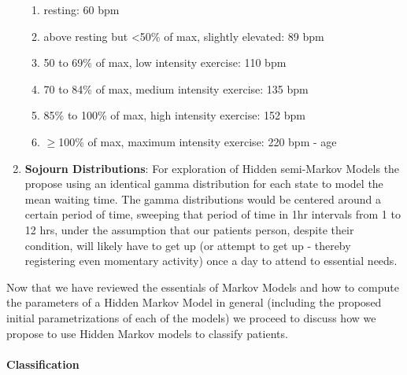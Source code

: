 \documentclass[]{article}
\begin{document}
\begin{enumerate}
	\begin{enumerate}
		\item resting: 60 bpm
		\item above resting but \textless50\% of max, slightly elevated: 89 bpm
		\item 50 to 69\% of max, low intensity exercise: 110 bpm
		\item 70 to 84\% of max, medium intensity exercise: 135 bpm
		\item 85\% to 100\% of max, high intensity exercise: 152 bpm
		\item $\geq$100\% of max, maximum intensity exercise: 220 bpm - age
	\end{enumerate}
	\item \textbf{Sojourn Distributions}: For exploration of Hidden semi-Markov Models the propose using an identical gamma distribution for each state to model the mean waiting time. The gamma distributions would be centered around a certain period of time, sweeping that period of time in 1hr intervals from 1 to 12 hrs, under the assumption that our patients person, despite their condition, will likely have to get up (or attempt to get up - thereby registering even momentary activity) once a day to attend to essential needs.
\end{enumerate}

Now that we have reviewed the essentials of Markov Models and how to compute the parameters of a Hidden Markov Model in general (including the proposed initial parametrizations of each of the models) we proceed to discuss how we propose to use Hidden Markov models to classify patients.

\paragraph{Classification}
\end{document}
